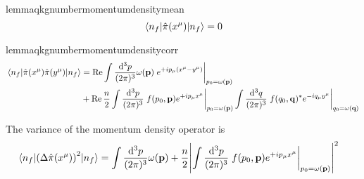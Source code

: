 \begin{restatable}{lemma}{qkgnumbermomentumdensitymean}\label{thm:number_state_momentum_density_mean}
	\begin{equation}
		\expval{\hat\pi(x^\mu)}{n_f}
		=
		0
	\end{equation}
\end{restatable}
\begin{restatable}{lemma}{qkgnumbermomentumdensitycorr}\label{thm:number_state_momentum_density_corr}
	\begin{equation}
		\begin{split}
			\expval{\hat\pi(x^\mu)\hat\pi(y^\mu)}{n_f}
			&=
			\Re
			\int\frac{\dd[3]{p}}{(2\pi)^3}
			\omega(\vb{p})
			\eval{e^{+ip_\mu(x^\mu-y^\mu)}}_{p_0=\omega(\vb{p})}
			\\
			&+
			\Re
			\frac{n}{2}
			\int\frac{\dd[3]{p}}{(2\pi)^3}
			\eval{
				f(p_0,\vb{p})
				e^{+ip_\mu x^\mu}
			}_{p_0=\omega(\vb{p})}
			\int\frac{\dd[3]{q}}{(2\pi)^3}
			\eval{
				f(q_0,\vb{q})^*
				e^{-iq_\mu y^\mu}
			}_{q_0=\omega(\vb{q})}
		\end{split}
	\end{equation}
\end{restatable}
\begin{corollary}
	The variance of the momentum density operator is
	\begin{equation}
		\begin{split}
			\expval{\left(\Delta\hat\pi(x^\mu)\right)^2}{n_f}
			&=
			\int\frac{\dd[3]{p}}{(2\pi)^3}
			\omega(\vb{p})
			+
			\frac{n}{2}
			\abs{
				\int\frac{\dd[3]{p}}{(2\pi)^3}
				\eval{
					f(p_0,\vb{p})
					e^{+ip_\mu x^\mu}
				}_{p_0=\omega(\vb{p})}
			}^2
		\end{split}
	\end{equation}
\end{corollary}